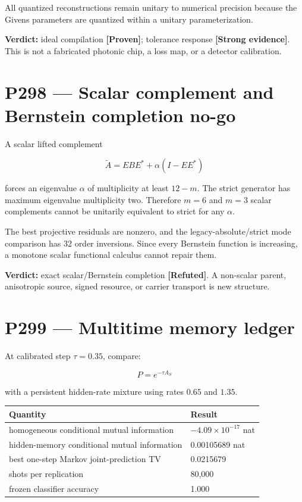 \documentclass[11pt,a4paper,openany]{report}
\newcommand{\statusProven}{\textcolor{fingreen}{[Proven]}}
\newcommand{\statusStrong}{\textcolor{finblue}{[Strong evidence]}}
\newcommand{\statusRefuted}{\textcolor{finred}{[Refuted]}}
\begin{document}
All quantized reconstructions remain unitary to numerical precision because the Givens parameters are quantized within a unitary parameterization.

\textbf{Verdict:} ideal compilation \textbf{\statusProven{}}; tolerance response \textbf{\statusStrong{}}. This is not a fabricated photonic chip, a loss map, or a detector calibration.

\section{P298 --- Scalar complement and Bernstein completion no-go}

A scalar lifted complement

\[
\widetilde A
=
E B E^\ast+\alpha(I-EE^\ast)
\]

forces an eigenvalue \(\alpha\) of multiplicity at least \(12-m\). The strict generator has maximum eigenvalue multiplicity two. Therefore \(m=6\) and \(m=3\) scalar complements cannot be unitarily equivalent to strict for any \(\alpha\).

The best projective residuals are nonzero, and the legacy-absolute/\allowbreak{}strict mode comparison has 32 order inversions. Since every Bernstein function is increasing, a monotone scalar functional calculus cannot repair them.

\textbf{Verdict:} exact scalar/\allowbreak{}Bernstein completion \textbf{\statusRefuted{}}. A non-scalar parent, anisotropic source, signed resource, or carrier transport is new structure.

\section{P299 --- Multitime memory ledger}

At calibrated step \(\tau=0.35\), compare:

\[
P=e^{-\tau A_S}
\]

with a persistent hidden-rate mixture using rates \(0.65\) and \(1.35\).

\begin{center}
\begingroup\small
\setlength{\tabcolsep}{2.5pt}
\renewcommand{\arraystretch}{1.16}
\begin{longtable}{@{}p{}p{}@{}}
\toprule
\textbf{Quantity} & \textbf{Result} \\
\midrule
\endhead
homogeneous conditional mutual information & \(-4.09\times10^{-17}\) nat \\
hidden-memory conditional mutual information & 0.00105689 nat \\
best one-step Markov joint-prediction TV & 0.0215679 \\
shots per replication & 80,000 \\
frozen classifier accuracy & 1.000 \\
\bottomrule
\end{longtable}
\endgroup
\end{center}
\end{document}
